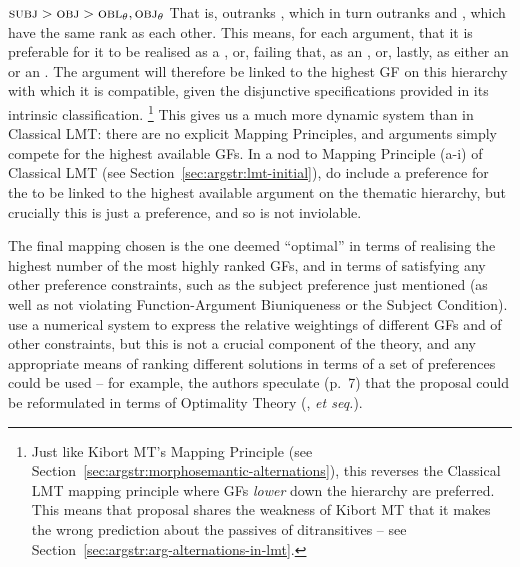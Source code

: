 \documentclass[output=paper]{langscibook}
\begin{document}
\ea\label{ex:butt-etal-gf-hierarchy}
$\textsc{subj}{} > \textsc{obj}{} > \mbox{\textsc{obl}$_{\theta}$}{}, \mbox{\textsc{obj}$_{\theta}$}{}$
\z
%
That is, \SUBJ outranks \OBJ, which in turn outranks \OBLTHETA and \OBJTHETA,
which have the same rank as each other. This means, for each argument, that it
is preferable for it to be realised as a \SUBJ, or, failing that, as an \OBJ,
or, lastly, as either an \OBLTHETA or an \OBJTHETA. The argument will therefore
be linked to the highest GF on this hierarchy with which it is compatible, given
the disjunctive specifications provided in its intrinsic classification.%
%
\footnote{Just like Kibort MT's Mapping Principle (see
  Section~\ref{sec:argstr:morphosemantic-alternations}), this reverses the Classical
  LMT mapping principle where GFs \emph{lower} down the hierarchy are preferred.
  This means that  proposal shares the weakness of
  Kibort MT that it makes the wrong prediction about the passives of
  ditransitives -- see Section~\ref{sec:argstr:arg-alternations-in-lmt}.}
%
This gives us a much more dynamic system than in Classical LMT: there are no
explicit Mapping Principles, and arguments simply compete for the highest
available GFs. In a nod to Mapping Principle (a-i) of Classical LMT (see
Section~\ref{sec:argstr:lmt-initial}), \citet[6]{butt1997architecture} do include a
preference for the \SUBJ to be linked to the highest available argument on the
thematic hierarchy, but crucially this is just a preference, and so is not
inviolable.

The final mapping chosen is the one deemed ``optimal'' in terms of realising the
highest number of the most highly ranked GFs, and in terms of satisfying any
other preference constraints, such as the subject preference just mentioned (as
well as not violating Function-Argument Biuniqueness or the Subject Condition).
\citet[7]{butt1997architecture} use a numerical system to express the relative
weightings of different GFs and of other constraints, but this is not a crucial
component of the theory, and any appropriate means of ranking different
solutions in terms of a set of preferences could be used -- for example, the
authors speculate (p.~7) that the proposal could be reformulated in terms of
Optimality Theory (\citealp{PrinceSmolensky1993,PrinceSmolensky2004}, \textit{et
  seq.}).
\end{document}
